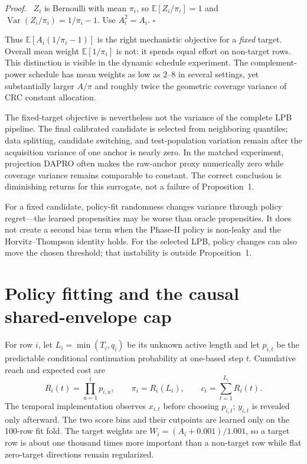 \documentclass[10pt]{article}
\newenvironment{proof}{\par\noindent\textit{Proof.}\ }{\hfill$\square$\par}
\newcommand{\E}{\mathbb{E}}
\newcommand{\Var}{\operatorname{Var}}
\begin{document}
\begin{proof}
$Z_i$ is Bernoulli with mean $\pi_i$, so
$\E[Z_i/\pi_i]=1$ and
$\Var(Z_i/\pi_i)=1/\pi_i-1$.  Use $A_i^2=A_i$.
\end{proof}

Thus $\E[A_i(1/\pi_i-1)]$ is the right mechanistic objective for a
\emph{fixed} target.  Overall mean weight $\E[1/\pi_i]$ is not: it spends
equal effort on non-target rows.  This distinction is visible in the dynamic
schedule experiment.  The complement-power schedule has mean weights as low
as 2--8 in several settings, yet substantially larger $A/\pi$ and roughly
twice the geometric coverage variance of CRC constant allocation.

The fixed-target objective is nevertheless not the variance of the complete
LPB pipeline.  The final calibrated candidate is selected from neighboring
quantiles; data splitting, candidate switching, and test-population variation
remain after the acquisition variance of one anchor is nearly zero.  In the
matched experiment, projection DAPRO often makes the raw-anchor proxy
numerically zero while coverage variance remains comparable to constant.  The
correct conclusion is diminishing returns for this surrogate, not a failure
of Proposition~1.

For a fixed candidate, policy-fit randomness changes variance through policy
regret---the learned propensities may be worse than oracle propensities.  It
does not create a second bias term when the Phase-II policy is non-leaky and
the Horvitz--Thompson identity holds.  For the selected LPB, policy changes can
also move the chosen threshold; that instability is outside Proposition~1.

\section{Policy fitting and the causal shared-envelope cap}

For row $i$, let $L_i=\min(T_i,q_i)$ be its unknown active length and let
$p_{i,t}$ be the predictable conditional continuation probability at
one-based step $t$.  Cumulative reach and expected cost are
\[
R_i(t)=\prod_{u=1}^t p_{i,u},\qquad
\pi_i=R_i(L_i),\qquad
c_i=\sum_{t=1}^{L_i}R_i(t).
\]
The temporal implementation observes $x_{i,t}$ before choosing $p_{i,t}$;
$y_{i,t}$ is revealed only afterward.  The two score bins and their cutpoints
are learned only on the 100-row fit fold.  The target weights are
$W_i=(A_i+0.001)/1.001$, so a target row is about one thousand times more
important than a non-target row while flat zero-target directions remain
regularized.
\end{document}
